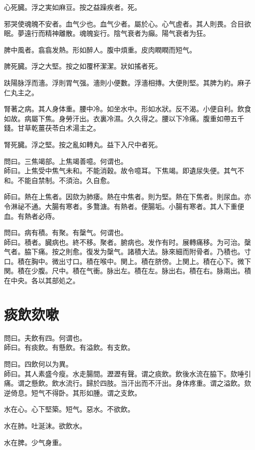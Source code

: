 \documentclass[12pt,twoside,UTF8,b5paper]{ctexbook}
\begin{document}
心死臓。浮之実如麻豆。按之益躁疾者。死。

邪哭使魂魄不安者。血气少也。血气少者。屬於心。心气虗者。其人則畏。合目欲眠。夢遠行而精神離散。魂魄妄行。陰气衰者为癲。陽气衰者为狂。

脾中風者。翕翕发熱。形如醉人。腹中煩重。皮肉瞤瞤而短气。

脾死臓。浮之大堅。按之如覆杯潔潔。狀如搖者死。

趺陽脉浮而濇。浮則胃气强。濇則小便數。浮濇相摶。大便則堅。其脾为約。麻子仁丸主之。

腎著之病。其人身体重。腰中冷。如坐水中。形如水狀。反不渴。小便自利。飲食如故。病屬下焦。身勞汗出。衣裏冷濕。久久得之。腰以下冷痛。腹重如帶五千錢。甘{草乾}薑{茯}苓{白}术湯主之。

腎死臓。浮之堅。按之亂如轉丸。益下入尺中者死。

問曰。三焦竭部。上焦竭善噫。何谓也。\\
師曰。上焦受中焦气未和。不能消穀。故令噫耳。下焦竭。即遺尿失便。其气不和。不能自禁制。不須治。久自愈。

師曰。熱在上焦者。因欬为肺痿。熱在中焦者。則为堅。熱在下焦者。則尿血。亦令淋祕不通。大腸有寒者。多鶩溏。有熱者。便腸垢。小腸有寒者。其人下重便血。有熱者必痔。

問曰。病有積。有聚。有䅽气。何谓也。\\
師曰。積者。臓病也。終不移。聚者。腑病也。发作有时。展轉痛移。为可治。䅽气者。脇下痛。按之則愈。復发为䅽气。諸積大法。脉來細而附骨者。乃積也。寸口。積在胸中。微出寸口。積在喉中。関上。積在脐傍。上関上。積在心下。微下関。積在少腹。尺中。積在气衝。脉出左。積在左。脉出右。積在右。脉兩出。積在中央。各以其部処之。

\chapter{痰飲欬嗽}

問曰。夫飲有四。何谓也。\\
師曰。有痰飲。有懸飲。有溢飲。有支飲。

問曰。四飲何以为異。\\
師曰。其人素盛今瘦。水走腸間。瀝瀝有聲。谓之痰飲。飲後水流在脇下。欬唾引痛。谓之懸飲。飲水流行。歸於四肢。当汗出而不汗出。身体疼重。谓之溢飲。欬逆倚息。短气不得卧。其形如腫。谓之支飲。

水在心。心下堅築。短气。惡水。不欲飲。

水在肺。吐涎沫。欲飲水。

水在脾。少气身重。
\end{document}
